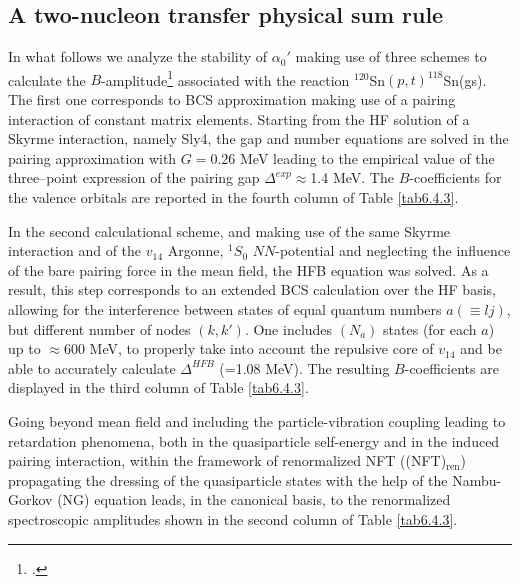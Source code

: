 \subsection{A two-nucleon transfer physical sum rule}\label{S6.4.2}
 In what follows we analyze the stability of $\alpha_0'$ making use of three schemes to calculate the $B$-amplitude\footnote{\cite{Potel:17}.} associated with the reaction $^{120}$Sn$(p,t)^{118}$Sn(gs). The first one corresponds to BCS approximation making use of a pairing interaction of constant matrix elements.  Starting from the HF solution of a Skyrme interaction, namely Sly4, the gap and number equations are solved in the pairing approximation with $G=0.26$ MeV leading to the empirical value of the three--point expression of the pairing gap $\Delta^{exp}\approx$1.4 MeV. The $B$-coefficients for the valence orbitals are reported in the fourth column of Table \ref{tab6.4.3}. 


In the second calculational scheme, and making use of the same Skyrme interaction and of the $v_{14}$ Argonne, $^1S_0$ $NN$-potential and neglecting the influence of the bare
pairing force in the mean field,
the HFB equation was solved. As a result, this step corresponds to an extended BCS calculation over the HF basis, allowing for the 
interference between states of equal quantum numbers $a (\equiv lj)$, but different number of nodes $(k,k')$. One includes $(N_a)$ states
(for each $a$) up to $\approx $600 MeV, to properly take into account  the repulsive core of $v_{14}$ and be able to accurately calculate 
$\Delta^{HFB}$ (=1.08 MeV). The resulting $B$-coefficients are displayed in the third column of Table \ref{tab6.4.3}.


 Going beyond mean field and including the particle-vibration coupling leading to retardation phenomena, both in the quasiparticle self-energy and in the  induced pairing interaction, within the framework of renormalized NFT ((NFT)$_{\text{ren}}$) propagating the dressing of the quasiparticle states with the help of the  Nambu-Gorkov (NG) equation leads, in the canonical basis, to the renormalized spectroscopic amplitudes shown in the second column of Table \ref{tab6.4.3}. 

